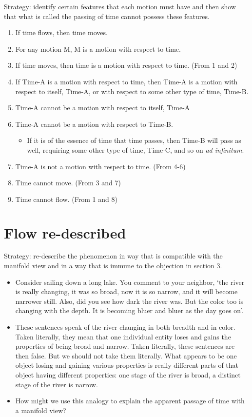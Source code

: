 \documentclass[oneside]{article}
\begin{document}
\noindent Strategy: identify certain features that each motion must have and then show that what is called the passing of time cannot possess these features. 

\begin{enumerate} 
\item If time flows, then time moves. 
\item For any motion M, M is a motion with respect to time.
\item If time moves, then time is a motion with respect to time. (From 1 and 2) 
\item If Time-A is a motion with respect to time, then Time-A is a motion with respect to itself, Time-A, or with respect to some other type of time, Time-B.  
\item Time-A cannot be a motion with respect to itself, Time-A
\item Time-A cannot be a motion with respect to Time-B. 
\begin{itemize}
\item If it is of the essence of time that time passes, then Time-B will pass as well, requiring some other type of time, Time-C, and so on \emph{ad infinitum}. 
\end{itemize}
\item Time-A is not a motion with respect to time. (From 4-6)
\item Time cannot move. (From 3 and 7) 
\item Time cannot flow. (From 1 and 8)
\end{enumerate}
\section{Flow re-described}

\noindent Strategy: re-describe the phenomenon in way that is compatible with the manifold view and in a way that is immune to the objection in section 3. 

\begin{itemize}
\item Consider sailing down a long lake. You comment to your neighbor, `the river is really changing, it was so broad, now it is so narrow, and it will become narrower still. Also, did you see how dark the river was. But the color too is changing with the depth. It is becoming bluer and bluer as the day goes on'. 
\item These sentences speak of the river changing in both breadth and in color. Taken literally, they mean that one individual entity loses and gains the properties of being broad and narrow. Taken literally, these sentences are then false. But we should not take them literally. What appears to be one object losing and gaining various properties is really different parts of that object having different properties: one stage of the river is broad, a distinct stage of the river is narrow. 
\item How might we use this analogy to explain the apparent passage of time with a manifold view? 
\end{itemize}
\end{document}
